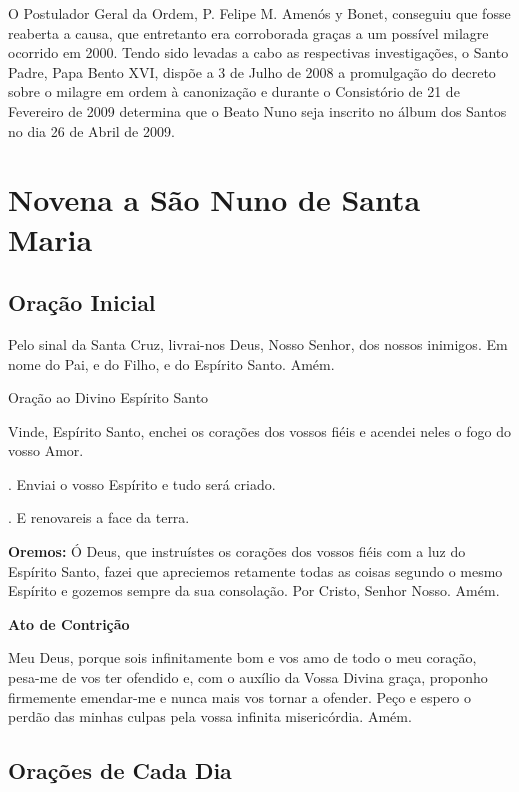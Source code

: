 \documentclass[a4paper,14pt]{extarticle} \usepackage[utf8]{inputenc}
\makeatletter
\newcommand{\vers@resp@sym}{%
  \raisebox{0.2ex}{\rotatebox[origin=c]{-20}{$\m@th\rceil$}}%
}
\newcommand{\vers@resp}[2]{%
  {\ooalign{%
     \hidewidth\kern#1\vers@resp@sym\hidewidth\cr
     #2\cr
  }}%
}
\DeclareRobustCommand{\versicle}{\vers@resp{-0.1em}{V}}
\DeclareRobustCommand{\response}{\vers@resp{0pt}{R}}
\makeatother
\begin{document}
O Postulador Geral da Ordem, P. Felipe M. Amenós y Bonet, conseguiu que fosse reaberta a causa, que entretanto era corroborada graças a um possível milagre ocorrido em 2000. Tendo sido levadas a cabo as respectivas investigações, o Santo Padre, Papa Bento XVI, dispõe a 3 de Julho de 2008 a promulgação do decreto sobre o milagre em ordem à canonização e durante o Consistório de 21 de Fevereiro de 2009 determina que o Beato Nuno seja inscrito no álbum dos Santos no dia 26 de Abril de 2009.

\newpage

\section{Novena a São Nuno de Santa Maria}

\subsection{Oração Inicial} \label{oracao-inicial}

Pelo sinal da Santa Cruz, livrai-nos Deus, Nosso Senhor, dos nossos inimigos. Em nome do Pai, e do Filho, e do Espírito Santo. Amém.

Oração ao Divino Espírito Santo

Vinde, Espírito Santo, enchei os corações dos vossos fiéis e acendei neles o fogo do vosso Amor.

\versicle. Enviai o vosso Espírito e tudo será criado.

\response. E renovareis a face da terra.

\textbf{Oremos:} Ó Deus, que instruístes os corações dos vossos fiéis com a luz do Espírito Santo, fazei que apreciemos retamente todas as coisas segundo o mesmo Espírito e gozemos sempre da sua consolação. Por Cristo, Senhor Nosso.
Amém.

\textbf{Ato de Contrição}

Meu Deus, porque sois infinitamente bom e vos amo de todo o meu coração, pesa-me de vos ter ofendido e, com o auxílio da Vossa Divina graça, proponho firmemente emendar-me e nunca mais vos tornar a ofender. Peço e espero o perdão das minhas culpas pela vossa infinita misericórdia. Amém.

\subsection{Orações de Cada Dia} \label{cotidie-oratio}
\end{document}
